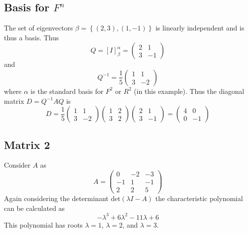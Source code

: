 \documentclass{article}[12pt]
\begin{document}
\subsection{Basis for $F^n$}
The set of eigenvectors $\beta=\left\{(2,3),(1,-1)\right\}$ is linearly
independent and is thus a basis. Thus
\[
Q = [I]_\beta^\alpha = \begin{pmatrix} 2 & 1 \\ 3 & -1 \end{pmatrix}
\]
and 
\[
Q^{-1}=\frac{1}{5} \begin{pmatrix} 1 & 1 \\ 3 & -2 \end{pmatrix}
\]
where $\alpha$ is the standard basis for $F^2$ or $R^2$ (in this example).
Thus the diagonal matrix $D=Q^{-1}AQ$ is
\[
D = \frac{1}{5} \begin{pmatrix} 1 & 1 \\ 3 & -2 \end{pmatrix}
                \begin{pmatrix} 1 & 2 \\ 3 & 2 \end{pmatrix}
                \begin{pmatrix} 2 & 1 \\ 3 & -1 \end{pmatrix} = 
\begin{pmatrix}
4 & 0 \\
0 & -1
\end{pmatrix}
\]

\subsection{Matrix 2}
Consider $A$ as
\[
A = \begin{pmatrix}
0 & -2 & -3 \\
-1 & 1 & -1 \\
2 & 2 & 5
\end{pmatrix}
\]
Again considering the determinant $\textrm{det}(\lambda I - A)$ the
characteristic polynomial can be calculated as
\[
-\lambda^3 + 6\lambda^2-11\lambda+6
\]
This polynomial has roots $\lambda=1$, $\lambda=2$, and $\lambda=3$.
\end{document}
